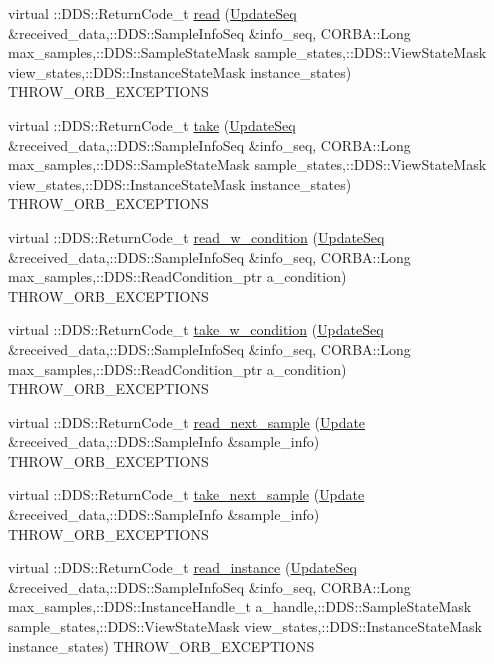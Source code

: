\begin{DoxyCompactItemize}
\item 
virtual ::DDS::ReturnCode\_\-t \hyperlink{classKnowledge_1_1UpdateDataReaderView__impl_a8d9cb37ef553b2cd4efcbfe7c2452de8}{read} (\hyperlink{namespaceKnowledge_ab62e46316b954f0d249e0e45de7059dc}{UpdateSeq} \&received\_\-data,::DDS::SampleInfoSeq \&info\_\-seq, CORBA::Long max\_\-samples,::DDS::SampleStateMask sample\_\-states,::DDS::ViewStateMask view\_\-states,::DDS::InstanceStateMask instance\_\-states) THROW\_\-ORB\_\-EXCEPTIONS
\item 
virtual ::DDS::ReturnCode\_\-t \hyperlink{classKnowledge_1_1UpdateDataReaderView__impl_a05d11f503b4ca8d1ab780824b3edd957}{take} (\hyperlink{namespaceKnowledge_ab62e46316b954f0d249e0e45de7059dc}{UpdateSeq} \&received\_\-data,::DDS::SampleInfoSeq \&info\_\-seq, CORBA::Long max\_\-samples,::DDS::SampleStateMask sample\_\-states,::DDS::ViewStateMask view\_\-states,::DDS::InstanceStateMask instance\_\-states) THROW\_\-ORB\_\-EXCEPTIONS
\item 
virtual ::DDS::ReturnCode\_\-t \hyperlink{classKnowledge_1_1UpdateDataReaderView__impl_a0c010dfd71b61b62f1d3c15846d84930}{read\_\-w\_\-condition} (\hyperlink{namespaceKnowledge_ab62e46316b954f0d249e0e45de7059dc}{UpdateSeq} \&received\_\-data,::DDS::SampleInfoSeq \&info\_\-seq, CORBA::Long max\_\-samples,::DDS::ReadCondition\_\-ptr a\_\-condition) THROW\_\-ORB\_\-EXCEPTIONS
\item 
virtual ::DDS::ReturnCode\_\-t \hyperlink{classKnowledge_1_1UpdateDataReaderView__impl_a57a71604ace17636dc3f6eef485a271b}{take\_\-w\_\-condition} (\hyperlink{namespaceKnowledge_ab62e46316b954f0d249e0e45de7059dc}{UpdateSeq} \&received\_\-data,::DDS::SampleInfoSeq \&info\_\-seq, CORBA::Long max\_\-samples,::DDS::ReadCondition\_\-ptr a\_\-condition) THROW\_\-ORB\_\-EXCEPTIONS
\item 
virtual ::DDS::ReturnCode\_\-t \hyperlink{classKnowledge_1_1UpdateDataReaderView__impl_a253570a1e6af3b8a57372c61d9635d00}{read\_\-next\_\-sample} (\hyperlink{structKnowledge_1_1Update}{Update} \&received\_\-data,::DDS::SampleInfo \&sample\_\-info) THROW\_\-ORB\_\-EXCEPTIONS
\item 
virtual ::DDS::ReturnCode\_\-t \hyperlink{classKnowledge_1_1UpdateDataReaderView__impl_a1e272da3714bbdbd7fb5f08cd14e8d90}{take\_\-next\_\-sample} (\hyperlink{structKnowledge_1_1Update}{Update} \&received\_\-data,::DDS::SampleInfo \&sample\_\-info) THROW\_\-ORB\_\-EXCEPTIONS
\item 
virtual ::DDS::ReturnCode\_\-t \hyperlink{classKnowledge_1_1UpdateDataReaderView__impl_ae5b78ddd3683ca3d665da4abf0203721}{read\_\-instance} (\hyperlink{namespaceKnowledge_ab62e46316b954f0d249e0e45de7059dc}{UpdateSeq} \&received\_\-data,::DDS::SampleInfoSeq \&info\_\-seq, CORBA::Long max\_\-samples,::DDS::InstanceHandle\_\-t a\_\-handle,::DDS::SampleStateMask sample\_\-states,::DDS::ViewStateMask view\_\-states,::DDS::InstanceStateMask instance\_\-states) THROW\_\-ORB\_\-EXCEPTIONS

\end{DoxyCompactItemize}
